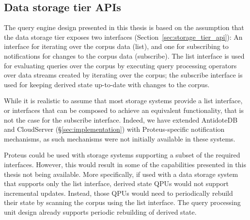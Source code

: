 \subsection{Data storage tier APIs}
\label{sec:discussion_apis}
The query engine design presented in this thesis is based on the assumption that the data storage tier exposes
two interfaces (Section~\ref{sec:storage_tier_api}):
An interface for iterating over the corpus data (list), and one for subscribing to notifications for changes to the
corpus data (subscribe).
The list interface is used for evaluating queries over the corpus by executing query processing operators over data streams
created by iterating over the corpus;
the subscribe interface is used for keeping derived state up-to-date with changes to the corpus.

While it is realistic to assume that most storage systems provide a list interface,
or interfaces that can be composed to achieve an equivalent functionality,
that is not the case for the subscribe interface.
Indeed, we have extended AntidoteDB and CloudServer (\S\ref{sec:implementation}) with Proteus-specific
notification mechanisms,
as such mechanisms were not initially available in these systems.

Proteus could be used with storage systems supporting a subset of the required interfaces.
However, this would result in some of the capabilities presented in this thesis not being available.
More specifically, if used with a data storage system that supports only the list interface,
derived state QPUs would not support incremental updates.
Instead, those QPUs would need to periodically rebuild their state by scanning the corpus using the list interface.
The query processing unit design already supports periodic rebuilding of derived state.

